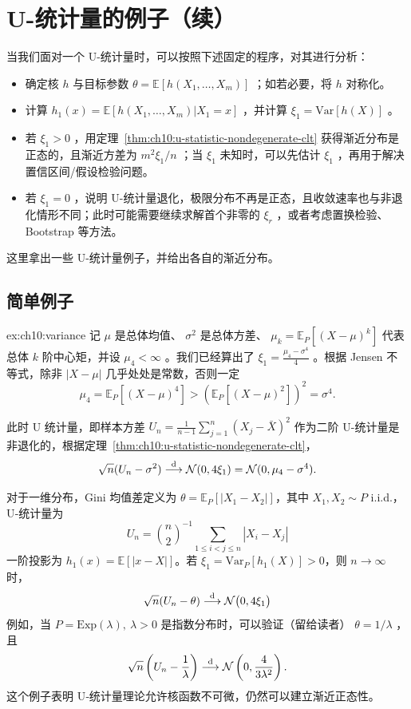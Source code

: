\section{U-统计量的例子（续）}

当我们面对一个 U-统计量时，可以按照下述固定的程序，对其进行分析：

\begin{itemize}
\tightlist
\item
  确定核 $h$ 与目标参数 $\theta=\mathbb E[h(X_1,\dots,X_m)]$ ；如若必要，将 $h$ 对称化。
\item
  计算 $h_1(x)=\mathbb{E}[h(X_1,\dots,X_m)|X_1=x]$ ，并计算 $\xi_1=\mathrm{Var}[h(X)]$ 。
\item
  若 $\xi_1>0$ ，用定理~\ref{thm:ch10:u-statistic-nondegenerate-clt} 获得渐近分布是正态的，且渐近方差为 $m^2\xi_1/n$ ；当 $\xi_1$ 未知时，可以先估计 $\xi_1$ ，再用于解决置信区间/假设检验问题。
\item
  若 $\xi_1=0$ ，说明 U-统计量退化，极限分布不再是正态，且收敛速率也与非退化情形不同；此时可能需要继续求解首个非零的 $\xi_r$ ，或者考虑置换检验、Bootstrap 等方法。
\end{itemize}

这里拿出一些 U-统计量例子，并给出各自的渐近分布。

\subsection{简单例子}

\begin{examplecontinue}[方差（续）]{ex:ch10:variance}
记 $\mu$ 是总体均值、 $\sigma^2$ 是总体方差、 $\mu_k=\mathbb E_P[(X-\mu)^k]$ 代表总体 $k$ 阶中心矩，并设 $\mu_4<\infty$ 。我们已经算出了 $\xi_1=\tfrac{\mu_4-\sigma^4}{4}$ 。根据 Jensen 不等式，除非 $|X-\mu|$ 几乎处处是常数，否则一定
\[
\mu_4=\mathbb E_P[(X-\mu)^4]>(\mathbb E_P[(X-\mu)^2])^2=\sigma^4.
\]

此时 U 统计量，即样本方差 $\textstyle U_n=\frac1{n-1}\sum_{j=1}^n(X_j-\bar X)^2$ 作为二阶 U-统计量是非退化的，根据定理~\ref{thm:ch10:u-statistic-nondegenerate-clt}，
\[
\sqrt n(U_n-\sigma^2)\overset{\rm d}\longrightarrow
\mathcal N(0,4\xi_1)=\mathcal N(0,\mu_4-\sigma^4).
\]
\end{examplecontinue}

\begin{example}\label{ex:ch10:gini-mean-difference}
对于一维分布，Gini 均值差定义为 $\theta = \mathbb{E}_P[|X_1 - X_2|]$，其中 $X_1,X_2\sim P$ i.i.d.，U‑统计量为
\[U_n = \binom{n}{2}^{-1} \sum_{1\le i<j\le n} |X_i - X_j|\]
一阶投影为 $h_1(x) = \mathbb{E}[|x - X|]$。若 $\xi_1=\mathrm{Var}_P[h_1(X)] > 0$，则 $n\to\infty$ 时，
\[\sqrt{n}(U_n - \theta) \overset{\rm d}\longrightarrow \mathcal{N}\big(0, 4\xi_1\big)\]
例如，当 $P=\mathrm{Exp}(\lambda),\ \lambda>0$ 是指数分布时，可以验证（留给读者） $\theta=1/\lambda$ ，且
\[
\sqrt{n}\left(U_n - \frac1\lambda\right) \overset{\rm d}\longrightarrow \mathcal{N}\left(0, \frac4{3\lambda^2}\right).
\]
这个例子表明 U‑统计量理论允许核函数不可微，仍然可以建立渐近正态性。
\end{example}


